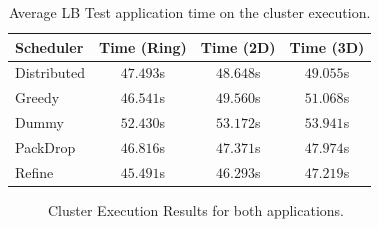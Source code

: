 \begin{table}[h]
	\centering
    \caption{Average LB Test application time on the cluster execution.}
	\begin{tabular}{l | c  c  c}
    	Scheduler & Time (Ring) & Time (2D) & Time (3D) \\ \hline
        Distributed & $47.493$s & $48.648$s & $49.055$s \\
        Greedy & $46.541$s & $49.560$s & $51.068$s \\
        Dummy & $52.430$s & $53.172$s & $53.941$s \\
        PackDrop & $46.816$s & $47.371$s & $47.974$s \\
        Refine & $45.491$s & $46.293$s & $47.219$s \\		
	\end{tabular}
    \label{tab:lbtest:apptime}
\end{table}

\begin{figure}
	\centering
	\caption{Cluster Execution Results for both applications.}
	\label{fofinho3}
\end{figure}

